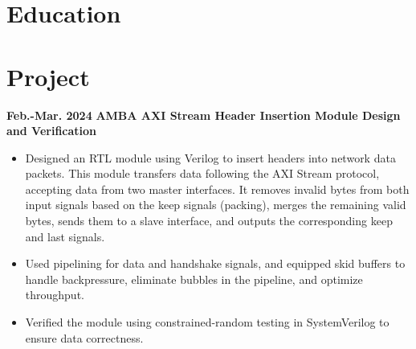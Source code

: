 \documentclass[11pt,a4paper,sans]{moderncv}
\begin{document}
\makecvtitle
\vspace{-1.5cm} 

\section{Education}

\vspace{-0.5cm} 
\section{Project}

\cventry
{\textnormal{\textbf{Feb.-Mar. 2024}}}
{\textnormal{\textbf{AMBA AXI Stream Header Insertion Module Design and Verification}}}
{}{}{}
{
    \begin{itemize}
        \item Designed an RTL module using Verilog to insert headers into network data packets. This module transfers data following the AXI Stream protocol, accepting data from two master interfaces. It removes invalid bytes from both input signals based on the keep signals (packing), merges the remaining valid bytes, sends them to a slave interface, and outputs the corresponding keep and last signals.
        \item Used pipelining for data and handshake signals, and equipped skid buffers to handle backpressure, eliminate bubbles in the pipeline, and optimize throughput.
        \item Verified the module using constrained-random testing in SystemVerilog to ensure data correctness.
    \end{itemize}
}
\end{document}
